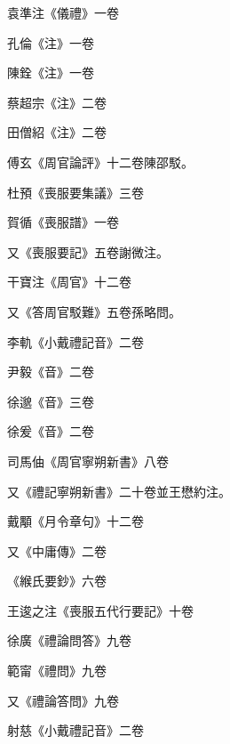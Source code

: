 \begin{pinyinscope}
 袁準注《儀禮》一卷



 孔倫《注》一卷



 陳銓《注》一卷



 蔡超宗《注》二卷



 田僧紹《注》二卷



 傅玄《周官論評》十二卷陳邵駁。



 杜預《喪服要集議》三卷



 賀循《喪服譜》一卷



 又《喪服要記》五卷謝微注。



 干寶注《周官》十二卷



 又《答周官駁難》五卷孫略問。



 李軌《小戴禮記音》二卷



 尹毅《音》二卷



 徐邈《音》三卷



 徐爰《音》二卷



 司馬伷《周官寧朔新書》八卷



 又《禮記寧朔新書》二十卷並王懋約注。



 戴顒《月令章句》十二卷



 又《中庸傳》二卷



 《緱氏要鈔》六卷



 王逡之注《喪服五代行要記》十卷



 徐廣《禮論問答》九卷



 範甯《禮問》九卷



 又《禮論答問》九卷



 射慈《小戴禮記音》二卷




\end{pinyinscope}
